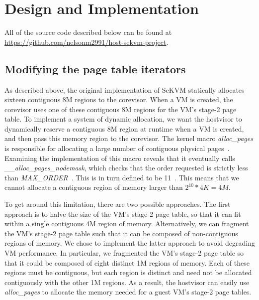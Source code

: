 \section{Design and Implementation}

All of the source code described below can be found at \url{https://github.com/nelsonm2991/host-sekvm-project}.

\subsection{Modifying the page table iterators}

As described above, the original implementation of SeKVM statically
allocates sixteen contiguous 8M regions to the corevisor. When a VM is created,
the corevisor uses one of these contiguous 8M regions for the VM's stage-2
page table. To implement a system of dynamic allocation, we want the hostvisor
to dynamically reserve a contiguous 8M region at runtime when a VM is created, and then
pass this memory region to the corevisor. The kernel macro \textit{alloc\_pages}
is responsible for allocating a large number of contiguous physical pages~\cite{kerneldocs}.
Examining the implementation of this macro reveals that it eventually
calls \textit{\_\_alloc\_pages\_nodemask}, which checks that the order requested
is strictly less than \textit{MAX\_ORDER}~\cite{page_alloc.c}. This
is in turn defined to be 11~\cite{mmzone.h}. This means that we cannot allocate
a contiguous region of memory larger than $2^{10} * 4K = 4M$.

To get around this limitation, there are two possible approaches. The first approach
is to halve the size of the VM's stage-2 page table, so that it can fit within
a single contiguous 4M region of memory. Alternatively, we can fragment the VM's stage-2
page table such that it can be composed of non-contiguous regions of memory. We
chose to implement the latter approach to avoid degrading VM performance. In
particular, we fragmented the VM's stage-2 page table so that it could be composed
of eight distinct 1M regions of memory. Each of these regions must be contiguous,
but each region is distinct and need not be allocated contiguously with the
other 1M regions. As a result, the hostvisor can easily use \textit{alloc\_pages}
to allocate the memory needed for a guest VM's stage-2 page tables.

